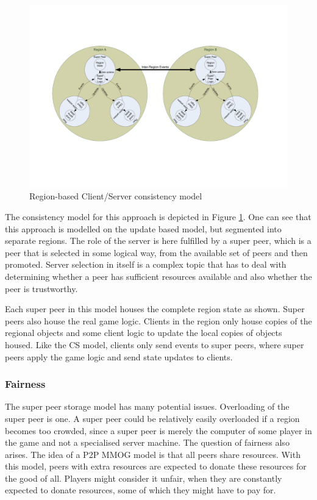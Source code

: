 \documentclass[10pt,a4paper,journal,cspaper,compsoc]{IEEEtran}
\begin{document}
\begin{figure}[htbp]
 \centering
 \includegraphics[clip=true, viewport=2cm 5cm 27cm 16.5cm, width=\textwidth]{region_based_CS_CM}
 \caption{Region-based Client/Server consistency model}
 \label{fig_cs_region_cm}
\end{figure}
%
The consistency model for this approach is depicted in Figure \ref{fig_cs_region_cm}. One can see that this approach is modelled on the update based
model, but segmented into separate regions. The role of the server is here fulfilled by a super peer, which is a peer that is selected in some
logical way, from the available set of peers and then promoted. Server selection in itself is a complex topic that has to deal with determining
whether a peer has sufficient resources available and also whether the peer is trustworthy.

Each super peer in this model houses the complete region state as shown. Super peers also house the real game logic. Clients in the region only house
copies of the regional objects and some client logic to update the local copies of objects housed. Like the \ac{CS} model, clients only send events
to super peers, where super peers apply the game logic and send state updates to clients.

\subsubsection{Fairness}
The super peer storage model has many potential issues. Overloading of the super peer is one. A super peer could be relatively easily overloaded if a
region becomes too crowded, since a super peer is merely the computer of some player in the game and not a specialised server machine. The question
of fairness also arises. The idea of a P2P MMOG model is that all peers share resources. With this model, peers with extra resources are expected to
donate these resources for the good of all. Players might consider it unfair, when they are constantly expected to donate resources, some of which
they might have to pay for.
\end{document}
